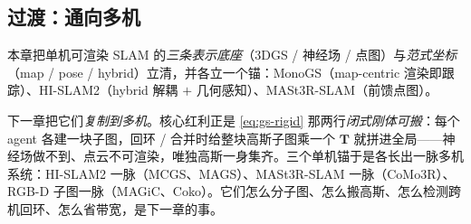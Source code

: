 \subsection{过渡：通向多机}

本章把单机可渲染 SLAM 的\emph{三条表示底座}（3DGS / 神经场 / 点图）与\emph{范式坐标}（map / pose / hybrid）立清，并各立一个锚：MonoGS（map-centric 渲染即跟踪）、HI-SLAM2（hybrid 解耦 $+$ 几何感知）、MASt3R-SLAM（前馈点图）。

下一章把它们\emph{复制到多机}。核心红利正是 \cref{eq:gs-rigid} 那两行\emph{闭式刚体可搬}：每个 agent 各建一块子图，回环 / 合并时给整块高斯子图乘一个 $\mathbf T$ 就拼进全局——神经场做不到、点云不可渲染，唯独高斯一身集齐。三个单机锚于是各长出一脉多机系统：HI-SLAM2 一脉（MCGS、MAGS）、MASt3R-SLAM 一脉（CoMo3R）、RGB-D 子图一脉（MAGiC、Coko）。它们怎么分子图、怎么搬高斯、怎么检测跨机回环、怎么省带宽，是下一章的事。
